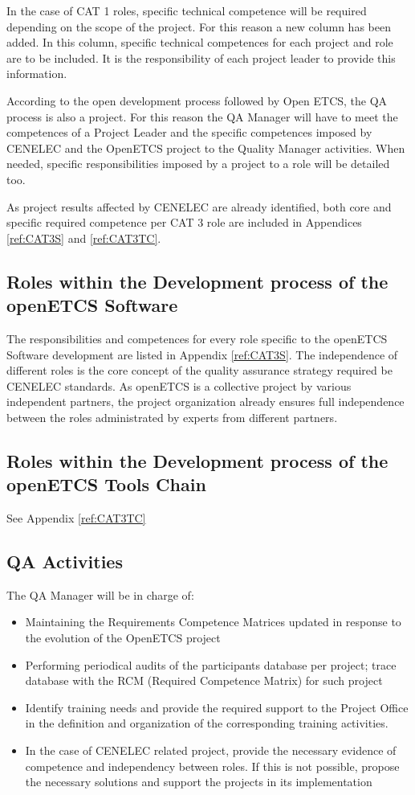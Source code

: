 \documentclass{template/openetcs_article}
\begin{document}
In the case of CAT 1 roles, specific technical competence will be required depending on the scope of the project. For this reason a new column has been added. In this column, specific technical competences for each project and role are to be included. It is the responsibility of each project leader to provide this information.

According to the open development process followed by Open \gls{ETCS}, the QA process is also a project. For this reason the QA Manager will have to meet the competences of a Project Leader and the specific competences imposed by CENELEC and the OpenETCS project to the Quality Manager activities. When needed, specific responsibilities imposed by a project to a role will be detailed too.

As project results affected by CENELEC are already identified, both core and specific required competence per CAT 3 role are included in Appendices \ref{ref:CAT3S} and \ref{ref:CAT3TC}.

\subsection{Roles within the Development process of the openETCS Software}
The responsibilities and competences for every role specific to the openETCS Software development are listed in Appendix \ref{ref:CAT3S}. The independence of different roles is the core concept of the quality assurance strategy required be CENELEC standards. As openETCS is a collective project by various independent partners, the project organization already ensures full independence between the roles administrated by experts from different partners. 

\subsection{Roles within the Development process of the openETCS Tools Chain}

See Appendix \ref{ref:CAT3TC}
\subsection{QA Activities}

The QA Manager will be in charge of:
\begin{itemize}
\item Maintaining the Requirements Competence Matrices updated in response to the evolution of the OpenETCS project
\item Performing periodical audits of the participants{\textquotesingle} database per project; trace database with the RCM (Required Competence Matrix) for such project
\item Identify training needs and provide the required support to the Project Office in the definition and organization of the corresponding training activities.
\item In the case of CENELEC related project, provide the necessary evidence of competence and independency between roles. If this is not possible, propose the necessary solutions and support the projects in its implementation
\end{itemize}
\end{document}
